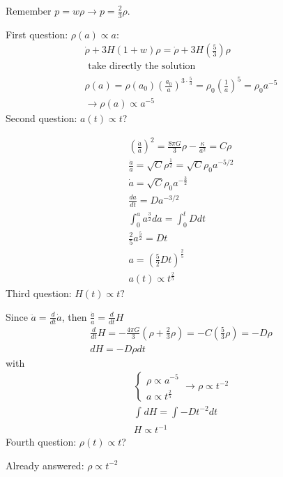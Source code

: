 Remember $p = w\rho  \to  p = \frac{2}{3}\rho $. \par
First question: $\rho \left( a \right)\propto a $:
\begin{gather*}
\dot{\rho } + 3H\left( 1+w \right)\rho = \dot{\rho }+ 3H\left( \frac{5}{3} \right)\rho  \\
\text{ take directly the solution }\\
\rho \left( a \right) = \rho \left( a_{0} \right)\left( \frac{a_{0}}{a} \right)^{3 \cdot \frac{5}{3}} = \rho _{0} \left( \frac{1}{a} \right)^{5} = \rho _{0}a^{-5}\\
\to \rho\left( a \right)\propto a^{-5}
\end{gather*}
Second question: $a\left( t \right)\propto t$?\par
\begin{gather*}
	\left( \frac{\dot{a}}{a} \right)^{2} = \frac{8\pi G}{3}\rho  - \frac{\kappa }{a^{2}}= C \rho  \\
	\frac{\dot{a}}{a} = \sqrt{C}\rho ^{\frac{1}{2}} = \sqrt{C} \rho _{0} a^{-5/2}\\
	\dot{a} = \sqrt{C}\rho _{0} a^{-\frac{3}{2}} \\
	\frac{d a}{d t} = D a^{-3/2}\\
	\int_{0}^{a}{a^{\frac{3}{2}}da} = \int_{0}^{t}{ D dt}\\
	\frac{2}{5}a^{\frac{5}{2}} = D t\\
	a = \left( \frac{5}{2}D t \right)^{\frac{2}{5}}\\
	a\left( t \right)\propto t^{\frac{2}{5}}
\end{gather*}
Third question: $H\left( t \right)\propto t?$\par
Since $\ddot{a} = \frac{d }{d t} \dot{a}$, then $ \frac{\ddot{a}}{a} = \frac{d }{d t} H$
\begin{gather*}
\frac{d }{d t} H = - \frac{4\pi G}{3} \left( \rho  + \frac{2}{3}\rho  \right) = - C \left( \frac{5}{3} \rho  \right) = - D \rho  \\
dH = - D \rho dt
\end{gather*}
with 
\begin{gather*}
\begin{cases}
\rho  \propto a^{-5} \\
a \propto t^{\frac{2}{5}}
\end{cases} \to \rho \propto t^{-2} \\
\int_{}^{}{dH} = \int_{}^{}{- D t^{-2} dt}\\
H \propto t^{-1}
\end{gather*}
Fourth question: $\rho \left( t \right) \propto t$?\par
Already answered: $\rho \propto t^{-2}$

